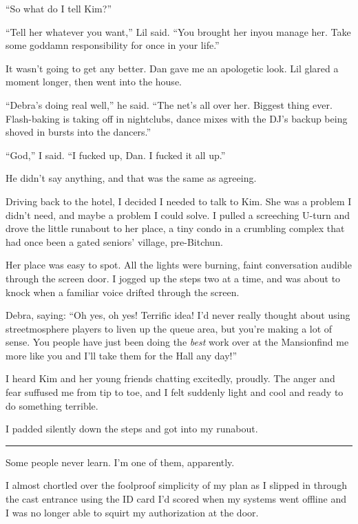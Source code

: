 “So what do I tell Kim?”

“Tell her whatever you want,” Lil said. “You brought her in{\dash}you
manage her. Take some goddamn responsibility for once in your
life.”

It wasn't going to get any better. Dan gave me an apologetic look.
Lil glared a moment longer, then went into the house.

“Debra's doing real well,” he said. “The net's all over her.
Biggest thing ever. Flash-baking is taking off in nightclubs, dance
mixes with the DJ's backup being shoved in bursts into the
dancers.”

“God,” I said. “I fucked up, Dan. I fucked it all up.”

He didn't say anything, and that was the same as agreeing.

Driving back to the hotel, I decided I needed to talk to Kim. She
was a problem I didn't need, and maybe a problem I could solve. I
pulled a screeching U-turn and drove the little runabout to her
place, a tiny condo in a crumbling complex that had once been a
gated seniors' village, pre-Bitchun.

Her place was easy to spot. All the lights were burning, faint
conversation audible through the screen door. I jogged up the steps
two at a time, and was about to knock when a familiar voice drifted
through the screen.

Debra, saying: “Oh yes, oh yes! Terrific idea! I'd never really
thought about using streetmosphere players to liven up the queue
area, but you're making a lot of sense. You people have just been
doing the \emph{best} work over at the Mansion{\dash}find me more like
you and I'll take them for the Hall any day!”

I heard Kim and her young friends chatting excitedly, proudly. The
anger and fear suffused me from tip to toe, and I felt suddenly
light and cool and ready to do something terrible.

I padded silently down the steps and got into my runabout.

\begin{center}\rule{1in}{0.4pt}\end{center}

Some people never learn. I'm one of them, apparently.

I almost chortled over the foolproof simplicity of my plan as I
slipped in through the cast entrance using the ID card I'd scored
when my systems went offline and I was no longer able to squirt my
authorization at the door.

